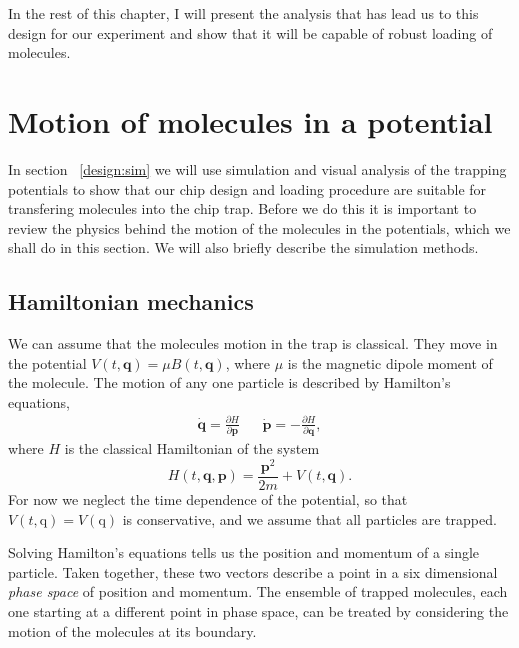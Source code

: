 In the rest of this chapter, I will present the analysis that has lead us to
this design for our experiment and show that it will be capable of robust
loading of \CaF{} molecules.

\section{Motion of molecules in a potential}

In section ~\ref{design:sim} we will use simulation and visual analysis of the
trapping potentials to show that our chip design and loading procedure are
suitable for transfering molecules into the chip trap. Before we do this it is
important to review the physics behind the motion of the molecules in the
potentials, which we shall do in this section. We will also briefly describe
the simulation methods.

\subsection{Hamiltonian mechanics}

We can assume that the molecules motion in the trap is classical. They move in
the potential $V(t, \mathbf{q}) = \mu B(t, \mathbf{q})$, where $\mu$ is the
magnetic dipole moment of the molecule.  The motion of any one particle is
described by Hamilton's equations,~\cite{Lichtenberg1969}
%
\begin{align}
  \label{design:eq:hamilton}
  \dot{\mathbf{q}} =  \frac{\partial H}{\partial \mathbf{p}} &&
  \dot{\mathbf{p}} = -\frac{\partial H}{\partial \mathbf{q}},
\end{align}
%
where $H$ is the classical Hamiltonian of the system
\begin{equation}
  H(t, \mathbf{q}, \mathbf{p}) = \frac{\mathbf{p}^2}{2m} + V(t, \mathbf{q}).
\end{equation}
For now we neglect the time dependence of the potential, so that $V(t,
\mathrm{q}) = V(\mathrm{q})$ is conservative, and we assume that all particles
are trapped.

Solving Hamilton's equations tells us the position and momentum of a single
particle. Taken together, these two vectors describe a point in a six
dimensional \emph{phase space} of position and momentum. The ensemble of
trapped molecules, each one starting at a different point in phase space, can
be treated by considering the motion of the molecules at its
boundary.~\cite{Hand1998}

